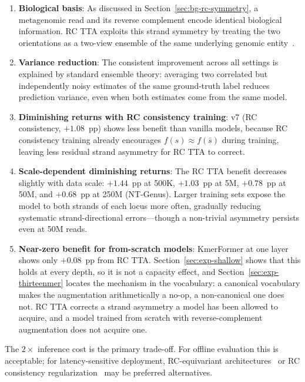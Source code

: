 \begin{enumerate}
    \item \textbf{Biological basis}: As discussed in Section~\ref{sec:bg-rc-symmetry}, a metagenomic read and its reverse complement encode identical biological information. RC TTA exploits this strand symmetry by treating the two orientations as a two-view ensemble of the same underlying genomic entity~\cite{Zhou2022rc}.
    
    \item \textbf{Variance reduction}: The consistent improvement across all settings is explained by standard ensemble theory: averaging two correlated but independently noisy estimates of the same ground-truth label reduces prediction variance, even when both estimates come from the same model.
    
    \item \textbf{Diminishing returns with RC consistency training}: v7 (RC consistency, $+1.08$~pp) shows less benefit than vanilla models, because RC consistency training already encourages $f(s) \approx f(\bar{s})$ during training, leaving less residual strand asymmetry for RC TTA to correct.

    \item \textbf{Scale-dependent diminishing returns}: The RC TTA benefit decreases slightly with data scale: $+1.44$~pp at 500K, $+1.03$~pp at 5M, $+0.78$~pp at 50M, and $+0.68$~pp at 250M (NT-Genus). Larger training sets expose the model to both strands of each locus more often, gradually reducing systematic strand-directional errors---though a non-trivial asymmetry persists even at 50M reads.

    \item \textbf{Near-zero benefit for from-scratch models}: KmerFormer at one layer shows only $+0.08$~pp from RC TTA. Section~\ref{sec:exp-shallow} shows that this holds at every depth, so it is not a capacity effect, and Section~\ref{sec:exp-thirteenmer} locates the mechanism in the vocabulary: a canonical vocabulary makes the augmentation arithmetically a no-op, a non-canonical one does not. RC TTA corrects a strand asymmetry a model has been allowed to acquire, and a model trained from scratch with reverse-complement augmentation does not acquire one.
\end{enumerate}

The $2\times$ inference cost is the primary trade-off. For offline evaluation this is acceptable; for latency-sensitive deployment, RC-equivariant architectures~\cite{Brown2021rc} or RC consistency regularization~\cite{Ma2025rc} may be preferred alternatives.


